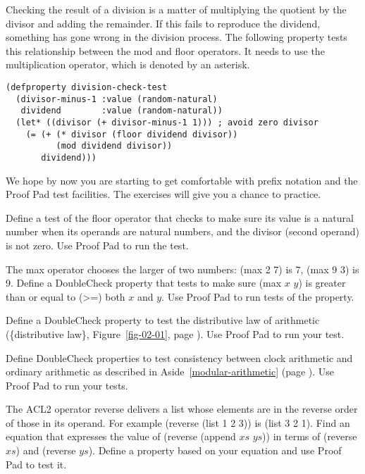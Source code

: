 Checking the result of a division is a matter
of multiplying the quotient by the divisor and adding the remainder.
If this fails to reproduce the dividend,
something has gone wrong in the division process.
The following property tests this relationship
between the \textsf{mod} and \textsf{floor} operators.
It needs to use the multiplication operator, which is denoted by an asterisk.

\label{division-check-test}
\begin{Verbatim}
(defproperty division-check-test
  (divisor-minus-1 :value (random-natural)
   dividend        :value (random-natural))
  (let* ((divisor (+ divisor-minus-1 1))) ; avoid zero divisor
    (= (+ (* divisor (floor dividend divisor))
          (mod dividend divisor))
       dividend)))
\end{Verbatim}

We hope by now you are starting to get comfortable with prefix notation
and the Proof Pad test facilities.
The exercises will give you a chance to practice.

\begin{ExerciseList}
\Exercise Define a test of the \textsf{floor} operator
that checks to make sure its value is a natural number
when its operands are natural numbers,
and the divisor (second operand) is not zero.
Use Proof Pad to run the test.

\Exercise The 
\textsf{max} 
operator chooses the larger of two numbers:
\textsf{(max 2 7)} is \textsf{7}, \textsf{(max 9 3)} is \textsf{9}.
Define a DoubleCheck property that tests to make sure
\textsf{(max $x$ $y$)} is
greater
than or equal to (\textsf{>=}) both $x$ and $y$.
Use Proof Pad to run tests of the property.

\Exercise
Define a DoubleCheck property to test the distributive law
of arithmetic (\{distributive law\}, Figure~\ref{fig-02-01}, page \pageref{fig-02-01}).
Use Proof Pad to run your test.

\Exercise
Define DoubleCheck properties to test consistency between clock
arithmetic and ordinary arithmetic as described in
Aside~\ref{modular-arithmetic} (page \pageref{modular-arithmetic}).
Use Proof Pad to run your tests.

\Exercise
The ACL2 operator 
\textsf{reverse}
delivers a list whose elements are in the reverse order of those in its operand.
For example \textsf{(reverse (list 1 2 3))} is \textsf{(list 3 2 1)}.
Find an equation that expresses the value of \textsf{(reverse (append $xs$ $ys$))}
in terms of \textsf{(reverse $xs$)} and \textsf{(reverse $ys$)}.
Define a property based on your equation and
use Proof Pad to test it.

\end{ExerciseList}


